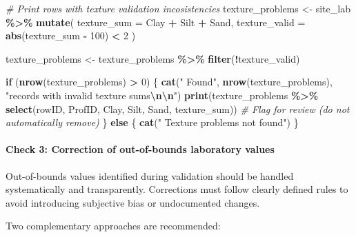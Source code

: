 \documentclass[
  10pt,
  b5paper,
  oneside]{book}
\newenvironment{Shaded}{\begin{snugshade}}{\end{snugshade}}
\newcommand{\AttributeTok}[1]{\textcolor[rgb]{0.13,0.29,0.53}{#1}}
\newcommand{\CommentTok}[1]{\textcolor[rgb]{0.56,0.35,0.01}{\textit{#1}}}
\newcommand{\ControlFlowTok}[1]{\textcolor[rgb]{0.13,0.29,0.53}{\textbf{#1}}}
\newcommand{\DecValTok}[1]{\textcolor[rgb]{0.00,0.00,0.81}{#1}}
\newcommand{\FunctionTok}[1]{\textcolor[rgb]{0.13,0.29,0.53}{\textbf{#1}}}
\newcommand{\NormalTok}[1]{#1}
\newcommand{\OtherTok}[1]{\textcolor[rgb]{0.56,0.35,0.01}{#1}}
\newcommand{\SpecialCharTok}[1]{\textcolor[rgb]{0.81,0.36,0.00}{\textbf{#1}}}
\newcommand{\StringTok}[1]{\textcolor[rgb]{0.31,0.60,0.02}{#1}}
\begin{document}
\begin{Shaded}
\begin{Highlighting}[]
\CommentTok{\# Print rows with texture validation incosistencies }
\NormalTok{texture\_problems }\OtherTok{\textless{}{-}}\NormalTok{ site\_lab }\SpecialCharTok{\%\textgreater{}\%}
  \FunctionTok{mutate}\NormalTok{(}
    \AttributeTok{texture\_sum =}\NormalTok{ Clay }\SpecialCharTok{+}\NormalTok{ Silt }\SpecialCharTok{+}\NormalTok{ Sand,}
    \AttributeTok{texture\_valid =} \FunctionTok{abs}\NormalTok{(texture\_sum }\SpecialCharTok{{-}} \DecValTok{100}\NormalTok{) }\SpecialCharTok{\textless{}} \DecValTok{2}
\NormalTok{  )}

\NormalTok{texture\_problems }\OtherTok{\textless{}{-}}\NormalTok{ texture\_problems }\SpecialCharTok{\%\textgreater{}\%}
  \FunctionTok{filter}\NormalTok{(}\SpecialCharTok{!}\NormalTok{texture\_valid)}

\ControlFlowTok{if}\NormalTok{ (}\FunctionTok{nrow}\NormalTok{(texture\_problems) }\SpecialCharTok{\textgreater{}} \DecValTok{0}\NormalTok{) \{}
  \FunctionTok{cat}\NormalTok{(}\StringTok{" Found"}\NormalTok{, }\FunctionTok{nrow}\NormalTok{(texture\_problems),}
      \StringTok{"records with invalid texture sums}\SpecialCharTok{\textbackslash{}n\textbackslash{}n}\StringTok{"}\NormalTok{)}
  \FunctionTok{print}\NormalTok{(texture\_problems }\SpecialCharTok{\%\textgreater{}\%}
          \FunctionTok{select}\NormalTok{(rowID, ProfID, Clay, Silt, Sand, texture\_sum))}
  \CommentTok{\# Flag for review (do not automatically remove)}
\NormalTok{\} }\ControlFlowTok{else}\NormalTok{ \{}
  \FunctionTok{cat}\NormalTok{(}\StringTok{" Texture problems not found"}\NormalTok{)}
\NormalTok{\}}
\end{Highlighting}
\end{Shaded}

\paragraph*{Check 3: Correction of out-of-bounds laboratory values}\label{check-3-correction-of-out-of-bounds-laboratory-values}

Out-of-bounds values identified during validation should be handled systematically and transparently. Corrections must follow clearly defined rules to avoid introducing subjective bias or undocumented changes.

Two complementary approaches are recommended:
\end{document}
